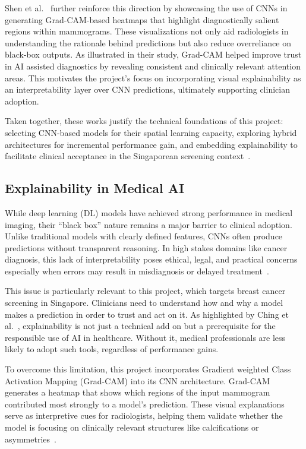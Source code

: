 \documentclass[12pt]{article}
\begin{document}
Shen et al.~\cite{7} further reinforce this direction by showcasing the use of CNNs in generating Grad-CAM-based heatmaps that highlight diagnostically salient regions within mammograms. These visualizations not only aid radiologists in understanding the rationale behind predictions but also reduce overreliance on black-box outputs. As illustrated in their study, Grad-CAM helped improve trust in AI assisted diagnostics by revealing consistent and clinically relevant attention areas. This motivates the project's focus on incorporating visual explainability as an interpretability layer over CNN predictions, ultimately supporting clinician adoption.

Taken together, these works justify the technical foundations of this project: selecting CNN-based models for their spatial learning capacity, exploring hybrid architectures for incremental performance gain, and embedding explainability to facilitate clinical acceptance in the Singaporean screening context~\cite{1,6,7}.

\subsection{Explainability in Medical AI}

While deep learning (DL) models have achieved strong performance in medical imaging, their “black box” nature remains a major barrier to clinical adoption. Unlike traditional models with clearly defined features, CNNs often produce predictions without transparent reasoning. In high stakes domains like cancer diagnosis, this lack of interpretability poses ethical, legal, and practical concerns especially when errors may result in misdiagnosis or delayed treatment~\cite{3}.

This issue is particularly relevant to this project, which targets breast cancer screening in Singapore. Clinicians need to understand how and why a model makes a prediction in order to trust and act on it. As highlighted by Ching et al.~\cite{3}, explainability is not just a technical add on but a prerequisite for the responsible use of AI in healthcare. Without it, medical professionals are less likely to adopt such tools, regardless of performance gains.

To overcome this limitation, this project incorporates Gradient weighted Class Activation Mapping (Grad-CAM) into its CNN architecture. Grad-CAM generates a heatmap that shows which regions of the input mammogram contributed most strongly to a model’s prediction. These visual explanations serve as interpretive cues for radiologists, helping them validate whether the model is focusing on clinically relevant structures like calcifications or asymmetries~\cite{5}.
\end{document}
